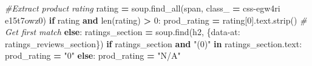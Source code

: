 \documentclass[
]{article}
\newenvironment{Shaded}{\begin{snugshade}}{\end{snugshade}}
\newcommand{\BuiltInTok}[1]{#1}
\newcommand{\CommentTok}[1]{\textcolor[rgb]{0.56,0.35,0.01}{\textit{#1}}}
\newcommand{\ControlFlowTok}[1]{\textcolor[rgb]{0.13,0.29,0.53}{\textbf{#1}}}
\newcommand{\DecValTok}[1]{\textcolor[rgb]{0.00,0.00,0.81}{#1}}
\newcommand{\KeywordTok}[1]{\textcolor[rgb]{0.13,0.29,0.53}{\textbf{#1}}}
\newcommand{\NormalTok}[1]{#1}
\newcommand{\OperatorTok}[1]{\textcolor[rgb]{0.81,0.36,0.00}{\textbf{#1}}}
\newcommand{\StringTok}[1]{\textcolor[rgb]{0.31,0.60,0.02}{#1}}
\begin{document}
\begin{Shaded}
\begin{Highlighting}[]
        \CommentTok{\#Extract product rating }
\NormalTok{        rating }\OperatorTok{=}\NormalTok{ soup.find\_all(}\StringTok{\textquotesingle{}span\textquotesingle{}}\NormalTok{, class\_ }\OperatorTok{=} \StringTok{\textquotesingle{}css{-}egw4ri e15t7owz0\textquotesingle{}}\NormalTok{)}
        \ControlFlowTok{if}\NormalTok{ rating }\KeywordTok{and} \BuiltInTok{len}\NormalTok{(rating) }\OperatorTok{\textgreater{}} \DecValTok{0}\NormalTok{:}
\NormalTok{          prod\_rating }\OperatorTok{=}\NormalTok{ rating[}\DecValTok{0}\NormalTok{].text.strip()  }\CommentTok{\# Get first match}
        \ControlFlowTok{else}\NormalTok{:}
\NormalTok{          ratings\_section }\OperatorTok{=}\NormalTok{ soup.find(}\StringTok{\textquotesingle{}h2\textquotesingle{}}\NormalTok{, \{}\StringTok{\textquotesingle{}data{-}at\textquotesingle{}}\NormalTok{: }\StringTok{\textquotesingle{}ratings\_reviews\_section\textquotesingle{}}\NormalTok{\})}
          \ControlFlowTok{if}\NormalTok{ ratings\_section }\KeywordTok{and} \StringTok{"(0)"} \KeywordTok{in}\NormalTok{ ratings\_section.text:}
\NormalTok{            prod\_rating }\OperatorTok{=} \StringTok{"0"}
          \ControlFlowTok{else}\NormalTok{:}
\NormalTok{            prod\_rating }\OperatorTok{=} \StringTok{"N/A"} 
        

\end{Highlighting}
\end{Shaded}
\end{document}
